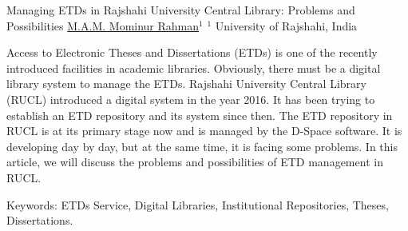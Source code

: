 
    \begin{abstract_online}{Managing ETDs in Rajshahi University Central Library: Problems and Possibilities}{%
    \underline{M.A.M. Mominur Rahman}$^{1}$}{%
    }{%
    $^1$ University of Rajshahi, India\newline{}
}

Access to Electronic Theses and Dissertations (ETDs) is one of the recently introduced facilities in academic libraries. Obviously, there must be a digital library system to manage the ETDs. Rajshahi University Central Library (RUCL) introduced a digital system in the year 2016. It has been trying to establish an ETD repository and its system since then. The ETD repository in RUCL is at its primary stage now and is managed by the D-Space software. It is developing day by day, but at the same time, it is facing some problems. In this article, we will discuss the problems and possibilities of ETD management in RUCL.

Keywords: ETDs Service, Digital Libraries, Institutional Repositories, Theses, Dissertations.
\end{abstract_online}

